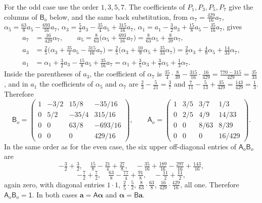 For the odd case use the order $1,3,5,7$. The coefficients of
$P_1,P_3,P_5,P_7$ give the columns of $\mathsf B_o$ below, and the same
back substitution, from
$\alpha_7=\frac{429}{16}a_7$,
$\alpha_5=\frac{63}8a_5-\frac{693}{16}a_7$,
$\alpha_3=\frac52a_3-\frac{35}4a_5+\frac{315}{16}a_7$,
$\alpha_1=a_1-\frac32a_3+\frac{15}8a_5-\frac{35}{16}a_7$, gives
\begin{align*}
a_7&=\tfrac{16}{429}\alpha_7,\qquad
a_5=\tfrac8{63}\bigl(\alpha_5+\tfrac{693}{16}a_7\bigr)
=\tfrac8{63}\alpha_5+\tfrac8{39}\alpha_7,\\
a_3&=\tfrac25\bigl(\alpha_3+\tfrac{35}4a_5-\tfrac{315}{16}a_7\bigr)
=\tfrac25\bigl(\alpha_3+\tfrac{10}9\alpha_5+\tfrac{35}{33}\alpha_7\bigr)
=\tfrac25\alpha_3+\tfrac49\alpha_5+\tfrac{14}{33}\alpha_7,\\
a_1&=\alpha_1+\tfrac32a_3-\tfrac{15}8a_5+\tfrac{35}{16}a_7
=\alpha_1+\tfrac35\alpha_3+\tfrac37\alpha_5+\tfrac13\alpha_7.
\end{align*}
Inside the parentheses of $a_3$, the coefficient of $\alpha_7$ is
$\frac{35}4\cdot\frac8{39}-\frac{315}{16}\cdot\frac{16}{429}
=\frac{770-315}{429}=\frac{35}{33}$, and in $a_1$ the coefficients of
$\alpha_5$ and $\alpha_7$ are $\frac23-\frac5{21}=\frac37$ and
$\frac7{11}-\frac5{13}+\frac{35}{429}=\frac{143}{429}=\frac13$.
Therefore
\[
\boxed{\mathsf B_o=
\begin{pmatrix}
1&-3/2&15/8&-35/16\\
0&5/2&-35/4&315/16\\
0&0&63/8&-693/16\\
0&0&0&429/16
\end{pmatrix}},\qquad
\boxed{\mathsf A_o=
\begin{pmatrix}
1&3/5&3/7&1/3\\
0&2/5&4/9&14/33\\
0&0&8/63&8/39\\
0&0&0&16/429
\end{pmatrix}}.
\]
In the same order as for the even case, the six upper off-diagonal
entries of $\mathsf A_o\mathsf B_o$ are
\[
-\tfrac32+\tfrac32,\quad
\tfrac{15}8-\tfrac{21}4+\tfrac{27}8,\quad
-\tfrac{35}{16}+\tfrac{189}{16}-\tfrac{297}{16}+\tfrac{143}{16},
\]
\[
-\tfrac72+\tfrac72,\quad
\tfrac{63}8-\tfrac{77}4+\tfrac{91}8,\quad
-\tfrac{11}2+\tfrac{11}2,
\]
again zero, with diagonal entries $1\cdot1$, $\frac25\cdot\frac52$,
$\frac8{63}\cdot\frac{63}8$, $\frac{16}{429}\cdot\frac{429}{16}$, all one.
Therefore $\mathsf A_o\mathsf B_o=\mathsf1$. In both cases
$\mathbf a=\mathsf A\boldsymbol\alpha$ and
$\boldsymbol\alpha=\mathsf B\mathbf a$.

